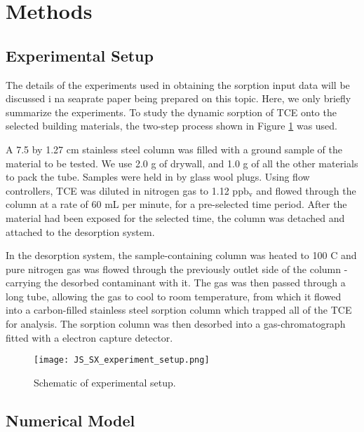 \section{Methods}\label{sec:methods}

\subsection{Experimental Setup}\label{sec:experimental_method}

The details of the experiments used in obtaining the sorption input data will be discussed i na seaprate paper being prepared on this topic.
Here, we only briefly summarize the experiments.
To study the dynamic sorption of TCE onto the selected building materials, the two-step process shown in Figure \ref{fig:js_sx_setup} was used.\par

A 7.5 by 1.27 cm stainless steel column was filled with a ground sample of the material to be tested.
We use 2.0 g of drywall, and 1.0 g of all the other materials to pack the tube.
Samples were held in by glass wool plugs.
Using flow controllers, TCE was diluted in nitrogen gas to 1.12 $\mathrm{ppb_v}$ and flowed through the column at a rate of 60 mL per minute, for a pre-selected time period.
After the material had been exposed for the selected time, the column was detached and attached to the desorption system.\par

In the desorption system, the sample-containing column was heated to 100 \degree C and pure nitrogen gas was flowed through the previously outlet side of the column - carrying the desorbed contaminant with it.
The gas was then passed through a long tube, allowing the gas to cool to room temperature, from which it flowed into a carbon-filled stainless steel sorption column which trapped all of the TCE for analysis.
The sorption column was then desorbed into a gas-chromatograph fitted with a electron capture detector.\par

\begin{figure}
  \texttt{[image: JS\_SX\_experiment\_setup.png]}
  \caption{Schematic of experimental setup.}
  \label{fig:js_sx_setup}
\end{figure}

\subsection{Numerical Model}\label{sec:model}


